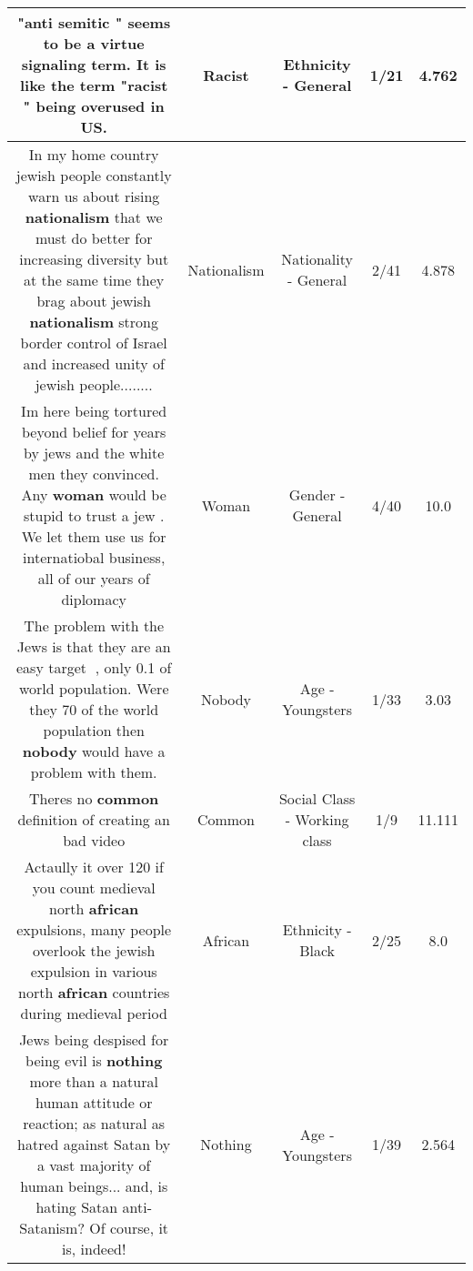 \documentclass[11pt]{article}
\newlength\mylength
\begin{document}
\begin{center}
\begin{longtable}{|C{.65\mylength}|C{.30\mylength}|C{.12\mylength}|C{.12\mylength}|C{.12\mylength}|}
  \small "anti semitic " seems to be a virtue signaling term. It is like the term "\textbf{racist} " being overused in US.\normalsize   & Racist & Ethnicity - General & 1/21 & 4.762 \\  \hline
  \small In my home country jewish people constantly warn us about rising \textbf{nationalism} that we must do better for increasing diversity but at the same time they brag about jewish \textbf{nationalism} strong border control of Israel and increased unity of jewish people........\normalsize   & Nationalism & Nationality - General & 2/41 & 4.878 \\  \hline
  \small Im here being tortured beyond belief for years by jews and the white men they convinced. Any \textbf{woman} would be stupid to trust a jew . We let them use us for internatiobal business, all of our years of diplomacy\normalsize   & Woman & Gender - General & 4/40 & 10.0 \\  \hline
  \small The problem with the Jews is that they are an easy target 🎯, only 0.1 of world population. Were they 70 of the world population then \textbf{nobody} would have a problem with them.\normalsize   & Nobody & Age - Youngsters & 1/33 & 3.03 \\  \hline
  \small Theres no \textbf{common} definition of creating an bad video\normalsize   & Common & Social Class - Working class & 1/9 & 11.111 \\  \hline
  \small Actaully it over 120 if you count medieval north \textbf{african} expulsions, many people overlook the  jewish expulsion in various north \textbf{african} countries during medieval period\normalsize   & African & Ethnicity - Black & 2/25 & 8.0 \\  \hline
  \small Jews being despised for being evil is \textbf{nothing} more than a natural human attitude or reaction; as natural as hatred against Satan by a vast majority of human beings... and, is hating Satan anti-Satanism? Of course, it is, indeed!\normalsize   & Nothing & Age - Youngsters & 1/39 & 2.564 \\  \hline

\end{longtable}
\end{center}
\end{document}

